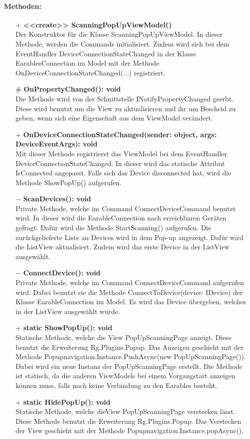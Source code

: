 \documentclass[a4paper,12pt]{article}
\begin{document}
	\paragraph{Methoden:}
	\begin{itemize}
		\item[+] \textbf{<<create>> ScanningPopUpViewModel()}\\Der Konstruktor für die Klasse ScanningPopUpViewModel. In dieser Methode, werden die Commands initialisiert. Zudem wird sich bei dem EventHandler DeviceConnectionStateChanged in der Klasse EarablesConnection im Model mit der Methode OnDeviceConnectionStateChanged(...) registriert.
		\item[\#] \textbf{OnPropertyChanged(): void}\\Die Methode wird von der Schnittstelle INotifyPropertyChanged geerbt. Diese wird benutzt um die View zu aktualisieren und ihr um Bescheid zu geben, wenn sich eine Eigenschaft aus dem ViewModel verändert.
		\item[+] \textbf{OnDeviceConnectionStateChanged(sender: object, args: DeviceEventArgs): void}\\Mit dieser Methode registrierst das ViewModel bei dem EventHandler DeviceConnectionStateChanged. In dieser wird das statische Attribut IsConnected angepasst. Falls sich das Device disconnected hat, wird die Methode ShowPopUp() aufgerufen.
		\item[$-$] \textbf{ScanDevices(): void}\\Private Methode, welche im Command ConnectDeviceCommand benutzt wird. In dieser wird die EarableConnection nach erreichbaren Geräten gefragt. Dafür wird die Methode StartScanning() aufgerufen. Die zurückgelieferte Liste an Devices wird in dem Pop-up angezeigt. Dafür wird die ListView aktualisiert. Zudem wird das erste Device in der ListView ausgewählt.
		\item[$-$] \textbf{ConnectDevice(): void}\\Private Methode, welche im Command ConnectDeviceCommand aufgerufen wird. Dabei benutzt sie die Methode ConnectToDevice(device: IDevice) der Klasse EarableConnection im Model. Es wird das Device übergeben, welches in der ListView ausgewählt wurde.
		\item[+] \textbf{static ShowPopUp(): void}\\Statische Methode, welche die View PopUpScanningPage anzeigt. Diese benutzt die Erweiterung \Gls{Rg.Plugins.Popup}. Das Anzeigen geschieht mit der Methode Popupnavigation.Instance.PushAsync(new PopUpScanningPage()). Dabei wird ein neue Instanz der PopUpScanningPage erstellt. Die Methode ist statisch, da die anderen ViewModels bei einem Vorgangstart anzeigen können muss, falls noch keine Verbindung zu den \gls{Earables} besteht.
		\item[+] \textbf{static HidePopUp(): void}\\Statische Methode, welche dieView PopUpScanningPage verstecken lässt. Diese Methode benutzt die Erweiterung \Gls{Rg.Plugins.Popup}. Das Verstecken der View geschieht mit der Methode Popupnavigation.Instance.popAsync(). 
	\end{itemize}
\end{document}
